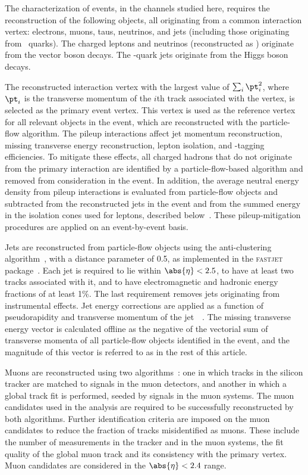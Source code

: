 \documentclass[11pt,twoside,a4paper,cmspaper,final,collab]{cms-tdr}
\begin{document}
The characterization of \VH events, in the channels studied here,
requires the reconstruction of the following objects, all originating from a common interaction vertex:
electrons, muons, taus, neutrinos, and jets (including those originating from \cPqb\ quarks). The charged leptons
and neutrinos (reconstructed as \MET) originate
from the vector boson decays. The \cPqb-quark jets originate from the Higgs boson decays.

The reconstructed interaction vertex with the largest value of
$\sum_i {\pt}_i^2$, where ${\pt}_i$ is the transverse momentum of
the $i$th track associated with the vertex, is selected as the primary event vertex. This vertex is used as the
reference vertex
for all relevant objects in the event, which are reconstructed with
the particle-flow algorithm. The pileup interactions affect jet momentum
reconstruction, missing transverse energy reconstruction,
lepton isolation, and \cPqb-tagging efficiencies.
To mitigate these effects,  all charged hadrons that do not
originate from the primary interaction are identified by a
particle-flow-based algorithm and removed from consideration in the event.
In addition, the average neutral energy density  from pileup interactions is
evaluated  from particle-flow objects and
subtracted from the reconstructed jets in the
event and from the summed energy in the isolation cones used for
leptons, described below~\cite{Cacciari:subtraction}.
These pileup-mitigation procedures are applied on an event-by-event basis.

Jets are reconstructed from particle-flow objects using the
anti-\kt clustering algorithm~\cite{antikt}, with a distance parameter of 0.5,
as implemented in the \textsc{fastjet}
package~\cite{Cacciari:fastjet1,Cacciari:fastjet2}.  Each jet is required to
lie within $\abs{\eta} < 2.5$, to have at least two tracks associated with it,
and to have electromagnetic and hadronic energy fractions of at least
1\%. The last requirement removes jets originating from
instrumental effects. Jet energy corrections are applied as a function of pseudorapidity and
transverse momentum of the jet~~\cite{Chatrchyan:2011ds}. The
missing transverse energy vector is calculated offline as the negative
of the vectorial sum of transverse momenta of all particle-flow objects identified in the
event, and the magnitude of this vector is referred to as \MET in the
rest of this article.

Muons are reconstructed using two algorithms~\cite{Chatrchyan:2012xi}: one in which
tracks in the silicon tracker are matched to signals in the muon
detectors, and another in which a global track fit is performed, seeded by
signals in the muon systems.  The muon
candidates used in the analysis are required to be successfully reconstructed
by both algorithms.  Further identification criteria  are
imposed on the muon candidates to reduce the fraction
of tracks misidentified as muons. These include the number of measurements in the tracker and
in the muon systems,
the fit quality of the global muon track and its consistency with the primary
vertex. Muon candidates are
considered in the  $\abs{\eta} < 2.4$ range.
\end{document}
